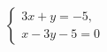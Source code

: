 \begin{ex}
	\begin{condition}
		\( \left\{
		\begin{array}{l}
			3x+y=-5,\\
			x-3y-5=0
		\end{array}
		\right. \)
	\end{condition}
\end{ex}
